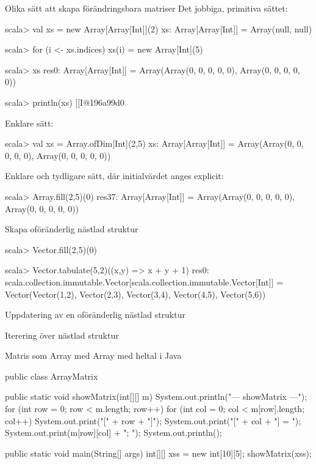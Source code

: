 \begin{Slide}{Olika sätt att skapa förändringsbara matriser}\SlideFontSmall
Det jobbiga, primitiva sättet:
\begin{REPL}
scala> val xs = new Array[Array[Int]](2)
xs: Array[Array[Int]] = Array(null, null)

scala> for (i <- xs.indices) {xs(i) = new Array[Int](5)}

scala> xs
res0: Array[Array[Int]] = Array(Array(0, 0, 0, 0, 0), Array(0, 0, 0, 0, 0))

scala> println(xs)
[[I@196a99d0
\end{REPL}
Enklare sätt:
\begin{REPL}
scala> val xs = Array.ofDim[Int](2,5)
xs: Array[Array[Int]] = Array(Array(0, 0, 0, 0, 0), Array(0, 0, 0, 0, 0))
\end{REPL}
Enklare och tydligare sätt, där initialvärdet anges explicit:
\begin{REPL}
scala> Array.fill(2,5)(0)
res37: Array[Array[Int]] = Array(Array(0, 0, 0, 0, 0), Array(0, 0, 0, 0, 0))
\end{REPL}

\end{Slide}

\begin{Slide}{Skapa oföränderlig nästlad struktur}
\begin{REPL}
scala> Vector.fill(2,5)(0)

scala> Vector.tabulate(5,2)((x,y) => x + y + 1)
res0: 
  scala.collection.immutable.Vector[scala.collection.immutable.Vector[Int]] = 
  Vector(Vector(1,2), Vector(2,3), Vector(3,4), Vector(4,5), Vector(5,6))


\end{REPL}

\end{Slide}

\begin{Slide}{Uppdatering av en oföränderlig nästlad struktur}
\end{Slide}


\begin{Slide}{Iterering över nästlad struktur}
\end{Slide}


\begin{Slide}{Matris som Array med Array med heltal i Java}
\begin{Code}[language=Java]
public class ArrayMatrix {

    public static void showMatrix(int[][] m){
        System.out.println("\n--- showMatrix ---");
        for (int row = 0; row < m.length; row++){
            for (int col = 0; col < m[row].length; col++) {
                System.out.print("[" + row + "]");
                System.out.print("[" + col + "] = ");
                System.out.print(m[row][col] + "; ");
            }
            System.out.println();
        }
    }
    
    public static void main(String[] args) {
        int[][] xss = new int[10][5];
        showMatrix(xss);
    }
}
\end{Code}
\end{Slide}

\fi












